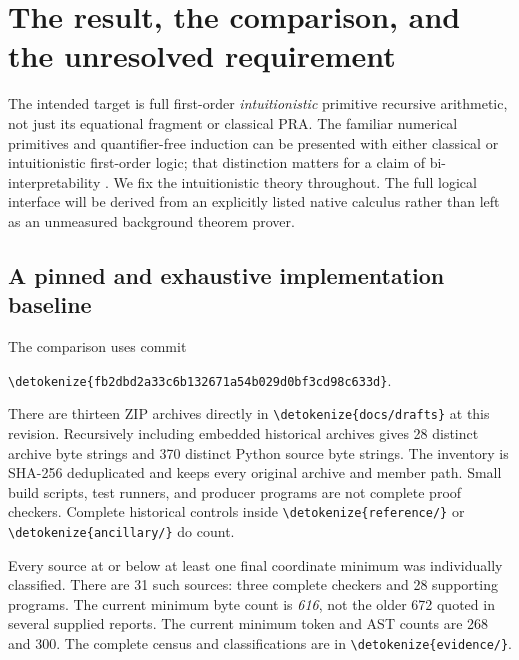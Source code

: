 \documentclass[11pt,letterpaper]{article}
\theoremstyle{definition}\newtheorem{definition}[theorem]{Definition}
\theoremstyle{remark}\newtheorem{remark}[theorem]{Remark}
\newcommand{\file}[1]{\expandafter\nolinkurl\expandafter{\detokenize{#1}}}
\begin{document}
\section{The result, the comparison, and the unresolved requirement}
\label{sec:result}

The intended target is full first-order \emph{intuitionistic} primitive
recursive arithmetic, not just its equational fragment or classical PRA.
The familiar numerical primitives and quantifier-free induction can be
presented with either classical or intuitionistic first-order logic;
that distinction matters for a claim of bi-interpretability
\cite{avigad,moschovakis}. We fix the intuitionistic theory throughout.
The full logical interface will be derived from an explicitly listed
native calculus rather than left as an unmeasured background theorem prover.

\subsection{A pinned and exhaustive implementation baseline}

The comparison uses commit
\begin{center}\small
\file{fb2dbd2a33c6b132671a54b029d0bf3cd98c633d}.
\end{center}
There are thirteen ZIP archives directly in \file{docs/drafts} at this
revision. Recursively including embedded historical archives gives 28
distinct archive byte strings and 370 distinct Python source byte strings.
The inventory is SHA-256 deduplicated and keeps every original archive
and member path. Small build scripts, test runners, and producer programs
are not complete proof checkers. Complete historical controls inside
\file{reference/} or \file{ancillary/} do count.

Every source at or below at least one final coordinate minimum was
individually classified. There are 31 such sources: three complete
checkers and 28 supporting programs. The current minimum byte count is
\emph{616}, not the older 672 quoted in several supplied reports. The
current minimum token and AST counts are 268 and 300. The complete
census and classifications are in \file{evidence/}.
\end{document}
